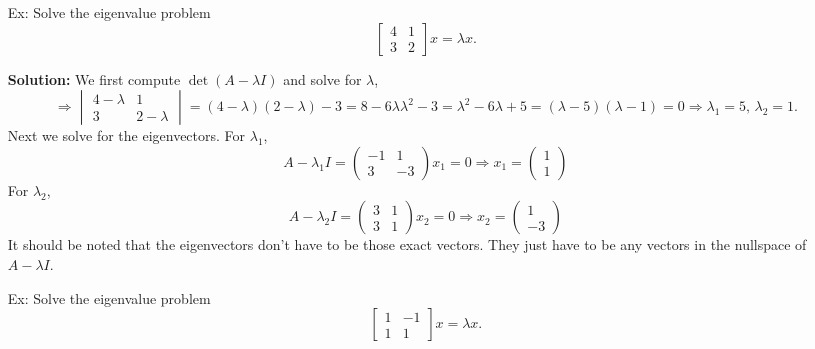 \documentclass[reqno]{amsart}
\theoremstyle{definition}
\begin{document}
\begin{enumerate}

\setlength{\itemsep}{2em}

\item[Ex:  ]  Solve the eigenvalue problem
%
\begin{equation*}
\begin{bmatrix}
4 & 1\\
3 & 2
\end{bmatrix}x = \lambda x.
\end{equation*}
%

\textbf{Solution:  }  We first compute $\det(A-\lambda I)$ and solve for $\lambda$,
%
\begin{equation*}
\Rightarrow \begin{vmatrix}
4-\lambda & 1\\
3 & 2-\lambda
\end{vmatrix} = (4-\lambda)(2-\lambda) - 3 = 8 - 6\lambda \lambda^2 - 3 = \lambda^2 - 6\lambda + 5 = (\lambda - 5)(\lambda - 1) = 0 \Rightarrow \lambda_1 = 5,\, \lambda_2 = 1.
\end{equation*}
%
Next we solve for the eigenvectors.  For $\lambda_1$,
%
\begin{equation*}
A - \lambda_1I = \begin{pmatrix}
-1 & 1\\
3 & -3
\end{pmatrix}x_1 = 0 \Rightarrow x_1 = \begin{pmatrix}
1\\
1
\end{pmatrix}
\end{equation*}
%
For $\lambda_2$,
%
\begin{equation*}
A - \lambda_2I = \begin{pmatrix}
3 & 1\\
3 & 1
\end{pmatrix}x_2 = 0 \Rightarrow x_2 = \begin{pmatrix}
1\\
-3
\end{pmatrix}
\end{equation*}
%
It should be noted that the eigenvectors don't have to be those exact vectors.  They just have to be any vectors in the nullspace of $A - \lambda I$.

\item[Ex:  ]  Solve the eigenvalue problem
%
\begin{equation*}
\begin{bmatrix}
1 & -1\\
1 & 1
\end{bmatrix}x = \lambda x.
\end{equation*}
%


\end{enumerate}
\end{document}
